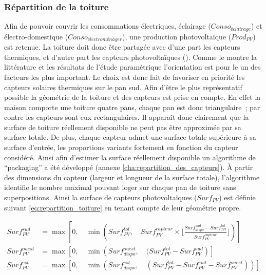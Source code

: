\subsubsection{Répartition de la toiture} %
\label{ssub:repartition_de_la_toiture}
Afin de pouvoir couvrir les consommations électriques, éclairage ($Conso_{éclairage}$) et
électro-domestique ($Conso_{électroménager}$), une production photovoltaïque ($Prod_{PV}$)
est retenue. La toiture doit donc être partagée avec d’une part les capteurs thermiques, et
d’autre part les capteurs photovoltaïques (). Comme le montre la littérature et les résultats
de l’étude paramétrique l’orientation est pour le  un des facteurs les plus
important. Le choix est donc fait de favoriser en priorité les capteurs solaires
thermiques sur le pan sud. Afin d’être le plus représentatif possible la géométrie
de la toiture et des capteurs est prise en compte.
En effet la maison comporte une toiture quatre pans, chaque pan est donc triangulaire~; par
contre les capteurs sont eux rectangulaires. Il apparaît donc clairement que la surface
de toiture réellement disponible ne peut pas être approximée par sa surface totale.
De plus, chaque capteur admet une surface totale supérieure à sa surface d’entrée,
les proportions variants fortement en fonction du capteur considéré.
Ainsi afin d’estimer la surface réellement disponible un algorithme de \enquote{packaging}
a été développé (annexe \ref{cha:repartition_des_capteurs}). À partir des dimensions
du capteur (largeur et longueur de la surface totale), l’algorithme identifie le
nombre maximal pouvant loger sur chaque pan de toiture sans superpositions.
Ainsi la surface de capteurs photovoltaïques ($Surf_{PV}$) est définie suivant
\eqref{eq:repartition_toiture} en tenant compte de leur géométrie propre.

\begin{equation}\label{eq:repartition_toiture}
  \begin{aligned}
    Surf_{PV}^{sud}   &= \max\left[0,\quad \min \left(Surf_{PV}^{tot},\quad Surf_{PV}^{capteur} \times
                                                      \Bigg\lfloor\frac{Surf_{dispo}^{sud} - Surf_{TH}^{tot}}{Surf_{PV}^{capteur}}\Bigg\rfloor\right)
                                   \right] \\
    Surf_{PV}^{ouest} &= \max \left[0,\quad \min\left(Surf_{dispo}^{ouest},\quad
                                                      (Surf_{PV}^{tot} - Surf_{PV}^{sud}\right)
                                    \right] \\
    Surf_{PV}^{est} &= \max \left[0,\quad \min\left(Surf_{dispo}^{est},\quad
                                                    (Surf_{PV}^{tot} - Surf_{PV}^{sud} - Surf_{PV}^{ouest}) \right) \right] \\
  \end{aligned}
\end{equation}

